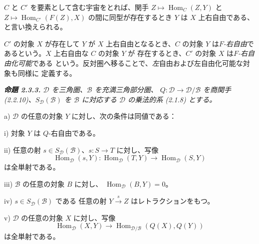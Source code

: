 \clearpage
{}%
\begingroup
\small
\setlength{\parskip}{0pt}%
\setlength{\emergencystretch}{1.5em}%
\setlength{\abovedisplayskip}{3pt plus 1pt minus 1pt}%
\setlength{\belowdisplayskip}{3pt plus 1pt minus 1pt}%

\noindent $C$ と $C'$ を要素として含む宇宙をとれば、関手
$Z\longmapsto\operatorname{Hom}_C(Z,Y)$ と
$Z\longmapsto\operatorname{Hom}_{C'}(F(Z),X)$ の間に同型が存在するとき
$Y$ は $X$ 上右自由である、と言い換えられる。

$C'$ の対象 $X$ が存在して $Y$ が $X$ 上右自由となるとき、$C$ の対象
$Y$ は\emph{$F$-右自由}であるという。$X$ 上右自由な $C$ の対象 $Y$ が
存在するとき、$C'$ の対象 $X$ は\emph{$F$-右自由化可能}である
という。反対圏へ移ることで、\emph{左}自由および左自由化可能な対象も同様に
定義する。

\medskip\begingroup\itshape
\noindent\textbf{命題 2.3.3.}\quad
$\mathcal D$ を三角圏、$\mathcal B$ を充満三角部分圏、
$Q\colon\mathcal D\longrightarrow\mathcal D/\mathcal B$ を商関手
(2.2.10)、$S_{\mathcal D}(\mathcal B)$ を $\mathcal B$ に対応する
$\mathcal D$ の乗法的系 (2.1.8) とする。

\par\noindent a) $\mathcal D$ の任意の対象 $Y$ に対し、次の条件は同値である：
\par\noindent\hspace{1.2em}i) 対象 $Y$ は $Q$-右自由である。
\par\noindent\hspace{1.2em}ii) 任意の射
$s\in S_{\mathcal D}(\mathcal B)$、$s\colon S\longrightarrow T$ に対し、写像
\[
  \operatorname{Hom}_{\mathcal D}(s,Y)\colon
  \operatorname{Hom}_{\mathcal D}(T,Y)\longrightarrow
  \operatorname{Hom}_{\mathcal D}(S,Y)
\]
は全単射である。
\par\noindent\hspace{1.2em}iii) $\mathcal B$ の任意の対象 $B$ に対し、
$\operatorname{Hom}_{\mathcal D}(B,Y)=0$。
\par\noindent\hspace{1.2em}iv) $s\in S_{\mathcal D}(\mathcal B)$ である
任意の射 $Y\xrightarrow{s}Z$ はレトラクションをもつ。
\par\noindent\hspace{1.2em}v) $\mathcal D$ の任意の対象 $X$ に対し、写像
\[
  \operatorname{Hom}_{\mathcal D}(X,Y)\longrightarrow
  \operatorname{Hom}_{\mathcal D/\mathcal B}(Q(X),Q(Y))
\]
は全単射である。

